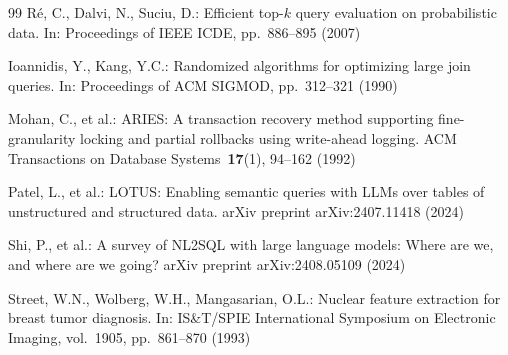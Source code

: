 \documentclass[runningheads]{llncs}
\begin{document}
\begin{thebibliography}{99}
R\'{e}, C., Dalvi, N., Suciu, D.:
Efficient top-$k$ query evaluation on probabilistic data.
In: Proceedings of IEEE ICDE, pp.~886--895 (2007)

Ioannidis, Y., Kang, Y.C.:
Randomized algorithms for optimizing large join queries.
In: Proceedings of ACM SIGMOD, pp.~312--321 (1990)

Mohan, C., et al.:
ARIES: A transaction recovery method supporting fine-granularity locking
and partial rollbacks using write-ahead logging.
ACM Transactions on Database Systems~\textbf{17}(1), 94--162 (1992)

Patel, L., et al.:
LOTUS: Enabling semantic queries with LLMs over tables of unstructured
and structured data.
arXiv preprint arXiv:2407.11418 (2024)

Shi, P., et al.:
A survey of NL2SQL with large language models: Where are we, and where
are we going?
arXiv preprint arXiv:2408.05109 (2024)

Street, W.N., Wolberg, W.H., Mangasarian, O.L.:
Nuclear feature extraction for breast tumor diagnosis.
In: IS\&T/SPIE International Symposium on Electronic Imaging,
vol.~1905, pp.~861--870 (1993)

\end{thebibliography}
\end{document}
